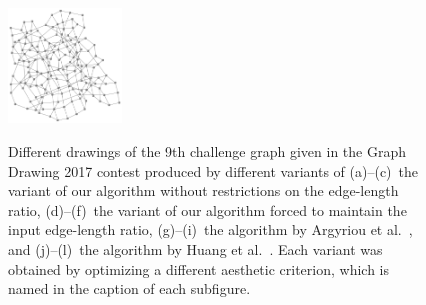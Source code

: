 \documentclass{comjnl}
\begin{document}
\begin{figure}[htbp]
{	\includegraphics[width=0.27\textwidth]{graph9-huang-total}}
	\caption{Different drawings of the 9th challenge graph given in the Graph Drawing 2017 contest produced by different variants of
	(a)--(c)~the variant of our algorithm without restrictions on the edge-length ratio, 
	(d)--(f)~the variant of our algorithm forced to maintain the input edge-length ratio,
	(g)--(i)~the algorithm by Argyriou et al.~\cite{DBLP:journals/cj/ArgyriouBS13}, and
	(j)--(l)~the algorithm by Huang et al.~\cite{DBLP:journals/vlc/HuangEHL13}.
	Each variant was obtained by optimizing a different aesthetic criterion, which is named in the caption of each subfigure.}
	\label{fig:graph9}
\end{figure}
\end{document}
